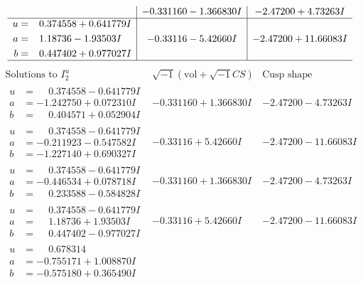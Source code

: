 \documentclass[1p]{elsarticle_modified}
\theoremstyle{definition}
\newcommand{\I}{\sqrt{-1}}
\begin{document}
$$\begin{array}{c|c|c}
 & -0.331160 - 1.366830 I & -2.47200 + 4.73263 I \\ \hline\begin{aligned}
u &= \phantom{-}0.374558 + 0.641779 I \\
a &= \phantom{-}1.18736 - 1.93503 I \\
b &= \phantom{-}0.447402 + 0.977027 I\end{aligned}
 & -0.33116 - 5.42660 I & -2.47200 + 11.66083 I\\
 \hline 
 \end{array}$$\newpage$$\begin{array}{c|c|c}  
\text{Solutions to }I^u_{2}& \I (\text{vol} + \sqrt{-1}CS) & \text{Cusp shape}\\
 \hline 
\begin{aligned}
u &= \phantom{-}0.374558 - 0.641779 I \\
a &= -1.242750 + 0.072310 I \\
b &= \phantom{-}0.404571 + 0.052904 I\end{aligned}
 & -0.331160 + 1.366830 I & -2.47200 - 4.73263 I \\ \hline\begin{aligned}
u &= \phantom{-}0.374558 - 0.641779 I \\
a &= -0.211923 - 0.547582 I \\
b &= -1.227140 + 0.690327 I\end{aligned}
 & -0.33116 + 5.42660 I & -2.47200 - 11.66083 I \\ \hline\begin{aligned}
u &= \phantom{-}0.374558 - 0.641779 I \\
a &= -0.446534 + 0.078718 I \\
b &= \phantom{-}0.233588 - 0.584828 I\end{aligned}
 & -0.331160 + 1.366830 I & -2.47200 - 4.73263 I \\ \hline\begin{aligned}
u &= \phantom{-}0.374558 - 0.641779 I \\
a &= \phantom{-}1.18736 + 1.93503 I \\
b &= \phantom{-}0.447402 - 0.977027 I\end{aligned}
 & -0.33116 + 5.42660 I & -2.47200 - 11.66083 I \\ \hline\begin{aligned}
u &= \phantom{-}0.678314\phantom{ +0.000000I} \\
a &= -0.755171 + 1.008870 I \\
b &= -0.575180 + 0.365490 I\end{aligned}

\end{array}$$
\end{document}
